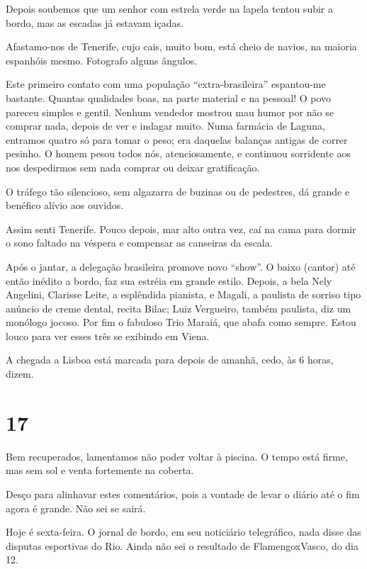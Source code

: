 Depois soubemos que um senhor com estrela verde na lapela tentou subir a bordo, mas as escadas já estavam içadas.

Afastamo-nos de Tenerife, cujo cais, muito bom, está cheio de navios, na maioria espanhóis mesmo. Fotografo alguns ângulos.

Este primeiro contato com uma população ``extra-brasileira'' espantou-me bastante. Quantas qualidades boas, na parte material e na pessoal! O povo pareceu simples e gentil. Nenhum vendedor mostrou mau humor por não se comprar nada, depois de ver e indagar muito. Numa farmácia de Laguna, entramos quatro só para tomar o peso; era daquelas balanças antigas de correr pesinho. O homem pesou todos nós, atenciosamente, e continuou sorridente aos nos despedirmos sem nada comprar ou deixar gratificação.

O tráfego tão silencioso, sem algazarra de buzinas ou de pedestres, dá grande e benéfico alívio aos ouvidos.

Assim senti Tenerife. Pouco depois, mar alto outra vez, caí na cama para dormir o sono faltado na véspera e compensar as canseiras da escala.

Após o jantar, a delegação brasileira promove novo ``show''. O baixo (cantor) até então inédito a bordo, faz sua estréia em grande estilo. Depois, a bela Nely Angelini, Clarisse Leite, a esplêndida pianista, e Magali, a paulista de sorriso tipo anúncio de creme dental, recita Bilac; Luiz Vergueiro, também paulista, diz um monólogo jocoso. Por fim o fabuloso Trio Maraiá, que abafa como sempre. Estou louco para ver esses três se exibindo em Viena.

A chegada a Lisboa está marcada para depois de amanhã, cedo, às 6 horas, dizem.

\section*{17 \adfflatleafright {}}

Bem recuperados, lamentamos não poder voltar à piscina. O tempo está firme, mas sem sol e venta fortemente na coberta.

Desço para alinhavar estes comentários, pois a vontade de levar o diário até o fim agora é grande. Não sei se sairá.

Hoje é sexta-feira. O jornal de bordo, em seu noticiário telegráfico, nada disse das disputas esportivas do Rio. Ainda não sei o resultado de FlamengoxVasco, do dia 12.

